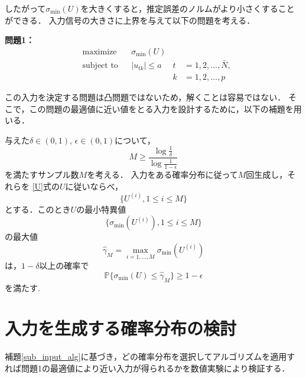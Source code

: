したがって$\sigma_{\text{min}}(U)$を大きくすると，推定誤差のノルムがより小さくすることができる．
入力信号の大きさに上界を与えて以下の問題を考える．\\
\par
\textbf{問題1：}
\begin{align*}
    & \text{maximize} &&  \sigma_{\min}(U) 
    \\
    & \text{subject to} 
    && |u_{tk}| \leq a &t &= 1, 2, \ldots,\bar{N}, \\
    &&&&k &= 1, 2, \ldots,p 
\end{align*}

この入力を決定する問題は凸問題ではないため，解くことは容易ではない．
そこで，この問題の最適値に近い値をとる入力を設計するために，以下の補題を用いる．


\begin{sub}
\cite{RAFA}
\label{sub_input_alg}
与えた$\delta \in (0, 1)$, $\epsilon \in (0, 1)$について，
\begin{equation*}
    M \geq \frac{\log{\frac{1}{\delta}}}{\log\frac{1}{1-\epsilon}}
\end{equation*}
を満たすサンプル数$M$を考える．  
入力をある確率分布に従って$M$回生成し，それらを
\eqref{U}式の$U$に従いならべ，
\begin{equation*}
    \{ U^{(i)}, 1 \leq i \leq M \} 
\end{equation*}
とする．このとき$U$の最小特異値
\begin{equation*}
    \{\sigma_{\min}(U^{(i)}),  1 \leq i \leq M\}
\end{equation*}
の最大値
\begin{equation*}
    \hat{\gamma}_M = \underset{i = 1, \ldots, M}{\max}\sigma_{\min}(U^{(i)})
\end{equation*}
は，$1-\delta$以上の確率で
\begin{equation}
    \mathbb{P} \{ \sigma_{\min}(U) \leq \hat{\gamma}_M \} \geq 1-\epsilon
\end{equation}
を満たす.
\end{sub}

\section{入力を生成する確率分布の検討}
補題\ref{sub_input_alg}に基づき，どの確率分布を選択してアルゴリズムを適用すれば問題1の最適値により近い入力が得られるかを数値実験により検証する．



